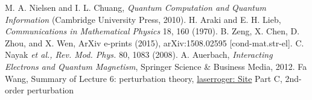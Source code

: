 \begin{thebibliography}{99}
M. A. Nielsen and I. L. Chuang, \textsl{Quantum Computation and Quantum Information} (Cambridge University Press, 2010).
H. Araki and E. H. Lieb, \textsl{Communications in Mathematical Physics} 18, 160 (1970).
B. Zeng, X. Chen, D. Zhou, and X. Wen, ArXiv e-prints (2015), arXiv:1508.02595 [cond-mat.str-el].
C. Nayak \textsl{et al., Rev. Mod. Phys.} 80, 1083 (2008).
A. Auerbach, \textsl{Interacting Electrons and Quantum Magnetism}, Springer Science \& Business Media, 2012.
Fa Wang, Summary of Lecture 6: perturbation theory, \href{http://laserroger.github.io/PekingPhysics/ADVQM2014/Lectures/Lecture06.pdf}{laserroger: Site} Part C, 2nd-order perturbation
\end{thebibliography}
